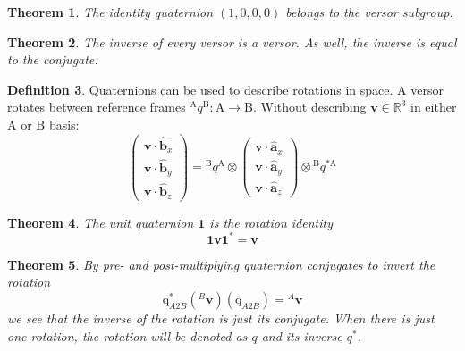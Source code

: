 \documentclass{amsart}
\newtheorem{theorem}{Theorem}[section]
\theoremstyle{definition}
\newtheorem{definition}[theorem]{Definition}
\theoremstyle{remark}
\numberwithin{equation}{section}
\begin{document}
\begin{theorem}
  The identity quaternion $(1, 0, 0, 0)$ belongs to the versor subgroup.
\end{theorem}

\begin{theorem}
  The inverse of every versor is a versor. As well, the inverse is equal to the conjugate.
\end{theorem}

\begin{definition}
  Quaternions can be used to describe rotations in space. A versor rotates between reference frames ${^\mathrm{A}q^\mathrm{B}}:\mathrm{A}\to\mathrm{B}$. Without describing $\mathbf{v}\in\mathbb{R}^3$ in either $\mathrm{A}$ or $\mathrm{B}$ basis:
  \begin{equation}
    \begin{pmatrix}
      \mathbf{v} \cdot \hat{\mathbf{b}}_x \\
      \mathbf{v} \cdot \hat{\mathbf{b}}_y \\
      \mathbf{v} \cdot \hat{\mathbf{b}}_z
    \end{pmatrix} = {^\mathrm{B}q^\mathrm{A}} \otimes 
    \begin{pmatrix}
      \mathbf{v} \cdot \hat{\mathbf{a}}_x \\
      \mathbf{v} \cdot \hat{\mathbf{a}}_y \\
      \mathbf{v} \cdot \hat{\mathbf{a}}_z
    \end{pmatrix} \otimes {^\mathrm{B}q^{*\mathrm{A}}}
  \end{equation}
\end{definition}

\begin{theorem}
  The \emph{unit quaternion} $\mathbf{1}$ is the rotation identity
  \begin{equation}
   \mathbf{1} \mathbf{v} \mathbf{1}^* = \mathbf{v}  
  \end{equation} 
\end{theorem}

\begin{theorem}
  By pre- and post-multiplying quaternion conjugates to invert the rotation
  \begin{equation}
    {\mathrm{q}_{A2B}^*}\left({^B\mathbf{v}}\right)\left(\mathrm{q}_{A2B}\right)={^A\mathbf{v}}
  \end{equation}
  we see that the inverse of the rotation is just its conjugate. When there is just one rotation, the rotation will be denoted as $q$ and its inverse $q^*$.
\end{theorem}
\end{document}
